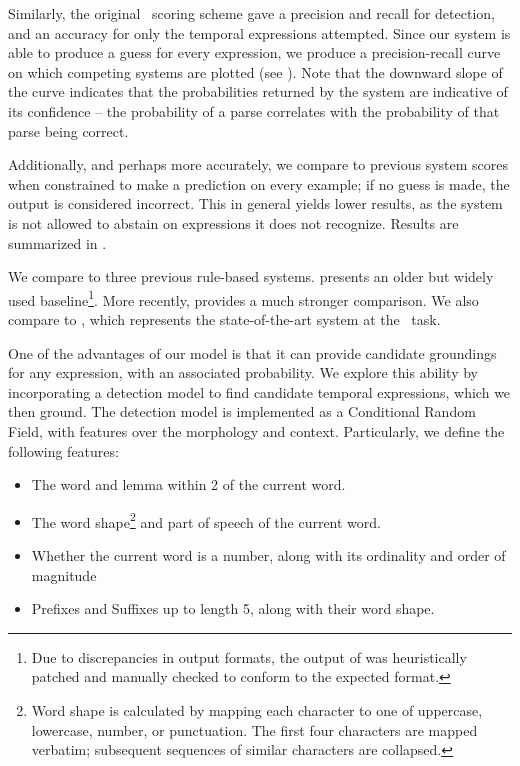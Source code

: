 
Similarly, the original \tempeval\ scoring scheme gave a precision 
	and recall for detection, and an accuracy for only the temporal expressions 
	attempted.
Since our system is able to produce a guess for every expression, we produce
	a precision-recall curve on which competing systems are plotted
	(see ).
Note that the downward slope of the curve indicates that the probabilities
	returned by the system are indicative of its confidence -- the probability
	of a parse correlates with the probability of that parse being correct.

Additionally, and perhaps more accurately, we compare to 
	previous system scores when constrained to make a prediction on every
	example; if no guess is made, the output is considered incorrect.
This in general yields lower results, as the system is not allowed to
	abstain on expressions it does not recognize.
Results are summarized in .

We compare to three previous rule-based systems.
 \cite{key:2000mani-temporal} presents an older but widely
	used baseline\footnote{
		Due to discrepancies in output formats, 
			the output of  was heuristically patched
			and manually checked to conform to the expected format.
	}.
More recently,  \cite{key:2012chang-temporal} 
	provides a much stronger comparison.
We also compare to  \cite{key:2010strotgen-temporal}, 
	which represents the state-of-the-art system at the \tempeval\ task.

One of the advantages of our model is that it can provide candidate groundings for any
	expression, with an associated probability.
We explore this ability by incorporating a detection model to find candidate temporal
	expressions, which we then ground.
The detection model is implemented as a Conditional Random Field, with features over the
	morphology and context.
Particularly, we define the following features:
\begin{itemize}
\item The word and lemma within 2 of the current word.
\item The word shape\footnote{
		Word shape is calculated by mapping each character to one of uppercase, lowercase, number,
			or punctuation.
		The first four characters are mapped verbatim; subsequent sequences of similar characters
			are collapsed.
	}
	and part of speech of the current word.
\item Whether the current word is a number, along with its ordinality and order of magnitude
\item Prefixes and Suffixes up to length 5, along with their word shape.
\end{itemize}

